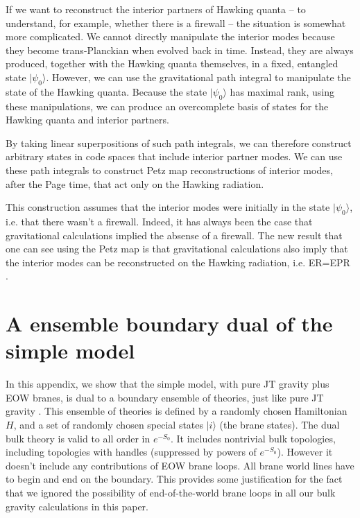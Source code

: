 \documentclass[12pt]{article}
\numberwithin{equation}{section}
\begin{document}
If we want to reconstruct the interior partners of Hawking quanta -- to understand, for example, whether there is a firewall \cite{Almheiri:2012rt} -- the situation is somewhat more complicated. We cannot directly manipulate the interior modes because they become trans-Planckian when evolved back in time. Instead, they are always produced, together with the Hawking quanta themselves, in a fixed, entangled state $|\psi_0\rangle$. However, we can use the gravitational path integral to manipulate the state of the Hawking quanta. Because the state $|\psi_0\rangle$ has maximal rank, using these manipulations, we can produce an overcomplete basis of states for the Hawking quanta and interior partners. 

By taking linear superpositions of such path integrals, we can therefore construct arbitrary states in code spaces that include interior partner modes. We can use these path integrals to construct Petz map reconstructions of interior modes, after the Page time, that act only on the Hawking radiation. 

This construction assumes that the interior modes were initially in the state $|\psi_0\rangle$, i.e. that there wasn't a firewall. Indeed, it has always been the case that gravitational calculations implied the absense of a firewall. The new result that one can see using the Petz map is that gravitational calculations also imply that the interior modes can be reconstructed on the Hawking radiation, i.e. ER=EPR \cite{Bousso:2012as,Nomura:2012sw,Verlinde:2012cy,Papadodimas:2012aq,Maldacena:2013xja}.

\section{A ensemble boundary dual of the simple model}\label{app:ensemble}
In this appendix, we show that the simple model, with pure JT gravity plus EOW branes, is dual to a boundary ensemble of theories, just like pure JT gravity \cite{Saad:2019lba}. This ensemble of theories is defined by a randomly chosen Hamiltonian $H$, and a set of randomly chosen special states $|i \rangle$ (the brane states). The dual bulk theory is valid to all order in $e^{-S_0}$. It includes nontrivial bulk topologies, including topologies with handles (suppressed by powers of $e^{-S_0}$). However it doesn't include any contributions of EOW brane loops. All brane world lines have to begin and end on the boundary. This provides some justification for the fact that we ignored the possibility of end-of-the-world brane loops in all our bulk gravity calculations in this paper.
\end{document}

